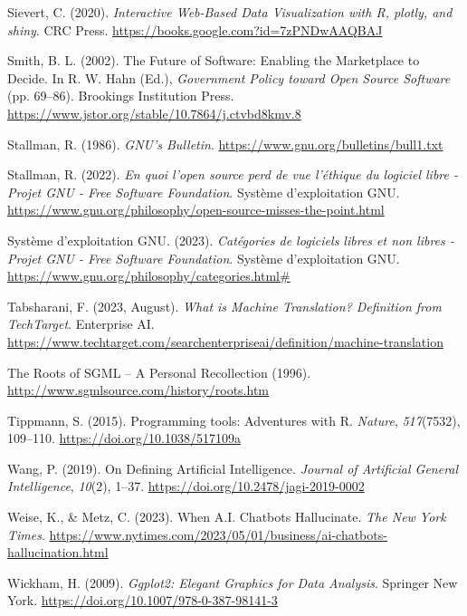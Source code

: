\documentclass[
  letterpaper,
  DIV=11,
  numbers=noendperiod]{scrreprt}
\newlength{\cslhangindent}
\newenvironment{CSLReferences}[2] %
 {\begin{list}{}{%
  \setlength{\itemindent}{0pt}
  \setlength{\leftmargin}{0pt}
  \setlength{\parsep}{0pt}
  \ifodd #1
   \setlength{\leftmargin}{\cslhangindent}
   \setlength{\itemindent}{-1\cslhangindent}
  \fi
  \setlength{\itemsep}{#2\baselineskip}}}
 {\end{list}}
\begin{document}
\begin{CSLReferences}{1}{0}
Sievert, C. (2020). \emph{Interactive {Web-Based Data Visualization}
with {R}, plotly, and shiny}. CRC Press.
\url{https://books.google.com?id=7zPNDwAAQBAJ}

Smith, B. L. (2002). The {Future} of {Software}: {Enabling} the
{Marketplace} to {Decide}. In R. W. Hahn (Ed.), \emph{Government
{Policy} toward {Open Source Software}} (pp. 69--86). Brookings
Institution Press.
\url{https://www.jstor.org/stable/10.7864/j.ctvbd8kmv.8}

Stallman, R. (1986). \emph{{GNU}'s {Bulletin}}.
\url{https://www.gnu.org/bulletins/bull1.txt}

Stallman, R. (2022). \emph{En quoi l'open source perd de vue l'éthique
du logiciel libre - {Projet GNU} - {Free Software Foundation}}. Système
d'exploitation GNU.
\url{https://www.gnu.org/philosophy/open-source-misses-the-point.html}

Système d'exploitation GNU. (2023). \emph{Catégories de logiciels libres
et non libres - {Projet GNU} - {Free Software Foundation}}. Système
d'exploitation GNU.
\url{https://www.gnu.org/philosophy/categories.html\#}

Tabsharani, F. (2023, August). \emph{What is {Machine Translation}?
{Definition} from {TechTarget}}. Enterprise AI.
\url{https://www.techtarget.com/searchenterpriseai/definition/machine-translation}

The {Roots} of {SGML} -- {A Personal Recollection} (1996).
\url{http://www.sgmlsource.com/history/roots.htm}

Tippmann, S. (2015). Programming tools: {Adventures} with {R}.
\emph{Nature}, \emph{517}(7532), 109--110.
\url{https://doi.org/10.1038/517109a}

Wang, P. (2019). On {Defining Artificial Intelligence}. \emph{Journal of
Artificial General Intelligence}, \emph{10}(2), 1--37.
\url{https://doi.org/10.2478/jagi-2019-0002}

Weise, K., \& Metz, C. (2023). When {A}.{I}. {Chatbots Hallucinate}.
\emph{The New York Times}.
\url{https://www.nytimes.com/2023/05/01/business/ai-chatbots-hallucination.html}

Wickham, H. (2009). \emph{Ggplot2: {Elegant Graphics} for {Data
Analysis}}. Springer New York.
\url{https://doi.org/10.1007/978-0-387-98141-3}


\end{CSLReferences}
\end{document}

